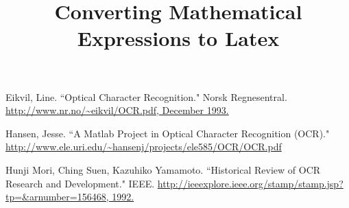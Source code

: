 \documentclass{article}
\begin{document}
\sloppy
\fboxsep=0cm
\title{Converting Mathematical Expressions to Latex}

\address{Rose-Hulman Institute of Technology}
\maketitle

%

%

%

%

%



\begin{thebibliography}{1}

   Eikvil, Line. ``Optical Character Recognition." Norsk 		Regnesentral. \url{http://www.nr.no/~eikvil/OCR.pdf, December 1993.}

   Hansen, Jesse.  ``A Matlab Project in Optical Character Recognition (OCR)." \url{http://www.ele.uri.edu/~hansenj/projects/ele585/OCR/OCR.pdf}

    Hunji Mori, Ching Suen, Kazuhiko Yamamoto. ``Historical Review of OCR Research and Development." IEEE. \url{http://ieeexplore.ieee.org/stamp/stamp.jsp?tp=&arnumber=156468, 1992.}
\end{thebibliography}
\end{document}
